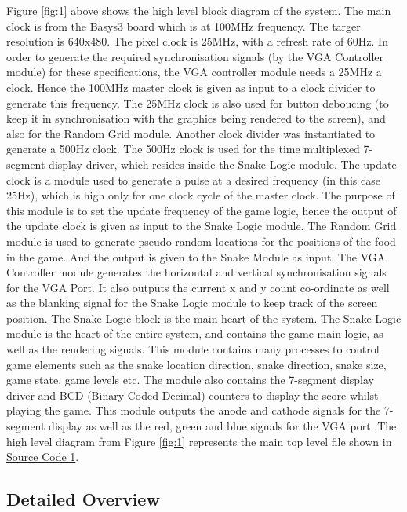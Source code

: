 \documentclass[aps, secnumarabic, balancelastpage, asmath, amssymb, nofootinbib, floatfix,]{revtex4-2}
\begin{document}
{Figure \ref{fig:1} above shows the high level block diagram of the system. The main clock is from the Basys3 board which is at 100MHz frequency. The targer resolution is 640x480. The pixel clock is 25MHz, with a refresh rate of 60Hz. In order to generate the required synchronisation signals (by the VGA Controller module) for these specifications, the VGA controller module needs a 25MHz a clock. Hence the 100MHz master clock is given as input to a clock divider to generate this frequency. The 25MHz clock is also used for button deboucing (to keep it in synchronisation with the graphics being rendered to the screen), and also for the Random Grid module. Another clock divider was instantiated to generate a 500Hz clock. The 500Hz clock is used for the time multiplexed 7-segment display driver, which resides inside the Snake Logic module. The update clock is a module used to generate a pulse at a desired frequency (in this case 25Hz), which is high only for one clock cycle of the master clock. The purpose of this module is to set the update frequency of the game logic, hence the output of the update clock is given as input to the Snake Logic module. The Random Grid module is used to generate pseudo random locations for the positions of the food in the game. And the output is given to the Snake Module as input. The VGA Controller module generates the horizontal and vertical synchronisation signals for the VGA Port. It also outputs the current x and y count co-ordinate as well as the blanking signal for the Snake Logic module to keep track of the screen position. The Snake Logic block is the main heart of the system. The Snake Logic module is the heart of the entire system, and contains the game main logic, as well as the rendering signals. This module contains many processes to control game elements such as the snake location direction, snake direction, snake size, game state, game levels etc. The module also contains the 7-segment display driver and BCD (Binary Coded Decimal) counters to display the score whilst playing the game. This module outputs the anode and cathode signals for the 7-segment display as well as the red, green and blue signals for the VGA port. The high level diagram from Figure \ref{fig:1} represents the main top level file shown in \hyperref[code:main]{Source Code 1}.

\vspace{-1.0em}
\subsection{\fontsize{11.4pt}{12pt}\selectfont \bf Detailed Overview \label{sec:2.2}}

}
\end{document}
